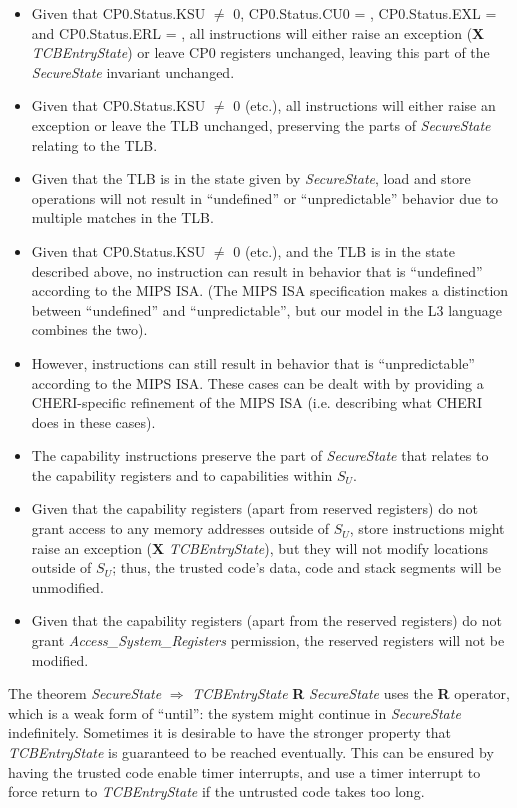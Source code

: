 \begin{itemize}
\item
Given that CP0.Status.KSU $\neq$ 0, CP0.Status.CU0 = \algorithmicfalse{},
CP0.Status.EXL = \algorithmicfalse{} and CP0.Status.ERL = \algorithmicfalse{},
all instructions will either raise an exception (\textbf{X}
\emph{TCBEntryState}) or leave CP0 registers unchanged, leaving this 
part of the \emph{SecureState} invariant unchanged.
\item
Given that CP0.Status.KSU $\neq$ 0 (etc.), all instructions will
either raise an exception or leave the TLB unchanged, preserving the parts of
\emph{SecureState} relating to the TLB.
\item
Given that the TLB is in the state given by \emph{SecureState}, load and store
operations will not result in ``undefined'' or ``unpredictable'' behavior due
to multiple matches in the TLB.
\item
Given that CP0.Status.KSU $\neq$ 0 (etc.), and the TLB is in the state
described above, no instruction can result in
behavior that is ``undefined'' according to the MIPS ISA. (The MIPS ISA
specification makes a distinction between ``undefined'' and ``unpredictable'',
but our model in the L3 language combines the two).
\item
However, instructions can still result in behavior that is ``unpredictable''
according to the MIPS ISA. These cases can be dealt with by providing a
CHERI-specific refinement of the MIPS ISA (i.e. describing what CHERI does in
these cases).
\item
The capability instructions preserve the part of \emph{SecureState} that
relates to the capability registers and to capabilities within $S_U$.
\item
Given that the capability registers (apart from reserved registers) do not grant
access to any memory addresses outside of $S_U$, store instructions might raise
an exception (\textbf{X} \emph{TCBEntryState}), but they will not modify locations
outside of $S_U$; thus, the trusted code's data, code and stack segments
 will be unmodified.
\item
Given that the capability registers (apart from the reserved registers) do
not grant \emph{Access\_System\_Registers} permission, the reserved
registers will not be modified.
\end{itemize}

The theorem \emph{SecureState} $\Rightarrow$ \emph{TCBEntryState} \textbf{R}
\emph{SecureState} uses the \textbf{R} operator, which is a weak form of
``until'': the system might continue in \emph{SecureState} indefinitely.
Sometimes it is desirable to have the stronger property that 
\emph{TCBEntryState} is guaranteed to be reached eventually. This can be
ensured by having the trusted code enable timer interrupts, and use a
timer interrupt to force return to \emph{TCBEntryState} if the untrusted
code takes too long.

